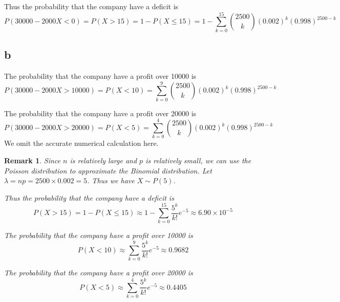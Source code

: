 \documentclass[a4paper, UTF-8]{article}
\theoremstyle{plain}
\newtheorem{remark}{\indent Remark}[section]
\begin{document}
Thus the probability that the company have a deficit is 
$$
P(30000 - 2000X < 0) = P(X > 15) = 1 - P(X \leq 15) = 1 - \sum_{k=0}^{15} \binom{2500}{k} (0.002)^k (0.998)^{2500-k}
$$

\subsection{b}

The probability that the company have a profit over 10000 is 
$$
P(30000 - 2000X > 10000) = P(X < 10) = \sum_{k=0}^{9} \binom{2500}{k} (0.002)^k (0.998)^{2500-k}
$$

The probability that the company have a profit over 20000 is 
$$
P(30000 - 2000X > 20000) = P(X < 5) = \sum_{k=0}^{4} \binom{2500}{k} (0.002)^k (0.998)^{2500-k}
$$
We omit the accurate numerical calculation here.

\begin{remark}
Since $n$ is relatively large and $p$ is relatively small, we can use the Poisson distribution to approximate the Binomial distribution. Let $\lambda = np = 2500 \times 0.002 = 5$. Thus we have $X \sim P(5)$.

Thus the probability that the company have a deficit is
$$
P(X > 15) = 1 - P(X \leq 15) \approx 1 - \sum_{k=0}^{15} \frac{5^k}{k!}e^{-5} \approx 6.90 \times 10^{-5}
$$

The probability that the company have a profit over 10000 is
$$
P(X < 10) \approx \sum_{k=0}^{9} \frac{5^k}{k!}e^{-5} \approx 0.9682
$$

The probability that the company have a profit over 20000 is
$$
P(X < 5) \approx \sum_{k=0}^{4} \frac{5^k}{k!}e^{-5} \approx 0.4405
$$

\end{remark}
\end{document}
